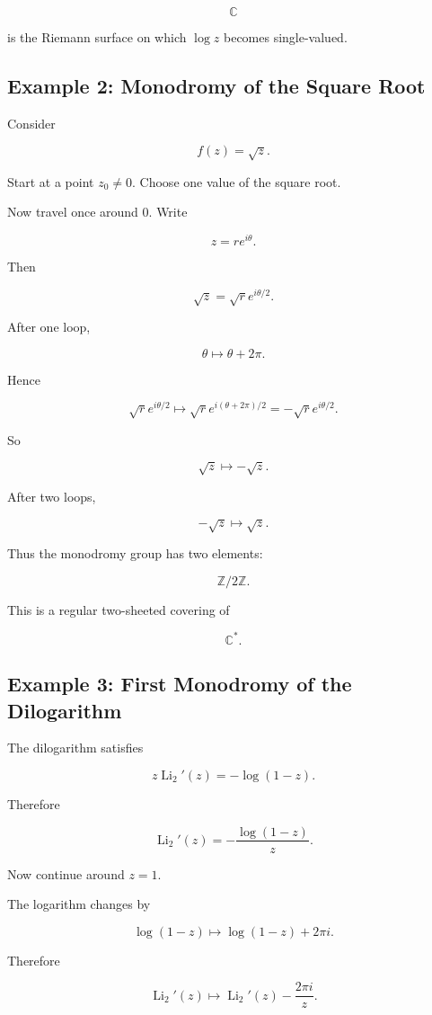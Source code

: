 \documentclass[12pt,a4paper]{article}
\theoremstyle{notespace}
\begin{document}
\[
\mathbb C
\]

is the Riemann surface on which \(\log z\) becomes single-valued.

\subsection{Example 2: Monodromy of the Square Root}

Consider

\[
f(z)=\sqrt z.
\]

Start at a point \(z_0\neq 0\). Choose one value of the square root.

Now travel once around \(0\). Write

\[
z=re^{i\theta}.
\]

Then

\[
\sqrt z=\sqrt r e^{i\theta/2}.
\]

After one loop,

\[
\theta\mapsto \theta+2\pi.
\]

Hence

\[
\sqrt r e^{i\theta/2}
\mapsto
\sqrt r e^{i(\theta+2\pi)/2}
=
-\sqrt r e^{i\theta/2}.
\]

So

\[
\sqrt z\mapsto -\sqrt z.
\]

After two loops,

\[
-\sqrt z\mapsto \sqrt z.
\]

Thus the monodromy group has two elements:

\[
\mathbb Z/2\mathbb Z.
\]

This is a regular two-sheeted covering of

\[
\mathbb C^*.
\]

\subsection{Example 3: First Monodromy of the Dilogarithm}

The dilogarithm satisfies

\[
z\operatorname{Li}_2'(z)
=
-\log(1-z).
\]

Therefore

\[
\operatorname{Li}_2'(z)
=
-\frac{\log(1-z)}{z}.
\]

Now continue around \(z=1\).

The logarithm changes by

\[
\log(1-z)
\mapsto
\log(1-z)+2\pi i.
\]

Therefore

\[
\operatorname{Li}_2'(z)
\mapsto
\operatorname{Li}_2'(z)
-
\frac{2\pi i}{z}.
\]
\end{document}
